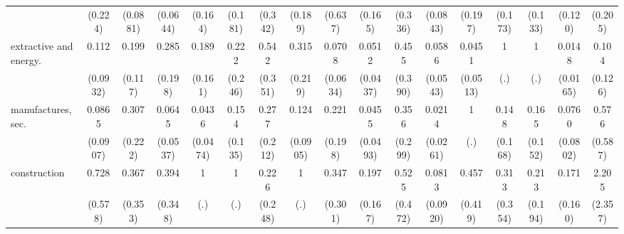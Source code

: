 {\begin{tabular}{l*{16}{c}}
                    &     (0.224)         &    (0.0881)         &    (0.0644)         &     (0.164)         &     (0.181)         &     (0.342)         &     (0.189)         &     (0.637)         &     (0.165)         &     (0.336)         &    (0.0843)         &     (0.197)         &     (0.173)         &     (0.133)         &     (0.120)         &     (0.205)         \\
[1em]
extractive and energy.&       0.112\sym{**} &       0.199\sym{**} &       0.285         &       0.189         &       0.222         &       0.542         &       0.315         &      0.0708\sym{**} &      0.0512\sym{***}&       0.455         &      0.0586\sym{**} &      0.0451\sym{**} &           1         &           1         &      0.0148\sym{***}&       0.104         \\
                    &    (0.0932)         &     (0.117)         &     (0.198)         &     (0.161)         &     (0.246)         &     (0.351)         &     (0.219)         &    (0.0634)         &    (0.0437)         &     (0.390)         &    (0.0543)         &    (0.0513)         &         (.)         &         (.)         &    (0.0165)         &     (0.126)         \\
[1em]
manufactures, sec.  &      0.0865\sym{*}  &       0.307         &      0.0645\sym{***}&      0.0436\sym{**} &       0.154\sym{*}  &       0.277         &       0.124\sym{**} &       0.221         &      0.0455\sym{**} &       0.356         &      0.0214\sym{**} &           1         &       0.148         &       0.165         &      0.0760\sym{*}  &       0.576         \\
                    &    (0.0907)         &     (0.222)         &    (0.0537)         &    (0.0474)         &     (0.135)         &     (0.212)         &    (0.0905)         &     (0.198)         &    (0.0493)         &     (0.299)         &    (0.0261)         &         (.)         &     (0.168)         &     (0.152)         &    (0.0802)         &     (0.587)         \\
[1em]
construction        &       0.728         &       0.367         &       0.394         &           1         &           1         &       0.226         &           1         &       0.347         &       0.197         &       0.525         &      0.0813\sym{*}  &       0.457         &       0.313         &       0.213         &       0.171         &       2.205         \\
                    &     (0.578)         &     (0.353)         &     (0.348)         &         (.)         &         (.)         &     (0.248)         &         (.)         &     (0.301)         &     (0.167)         &     (0.472)         &    (0.0920)         &     (0.419)         &     (0.354)         &     (0.194)         &     (0.160)         &     (2.357)         \\

\end{tabular}}
